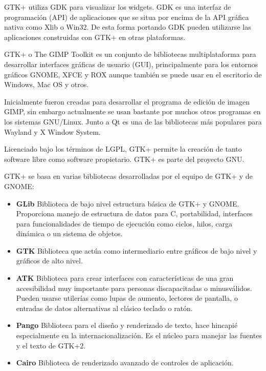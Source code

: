 \documentclass[12pt,twoside]{book}
\begin{document}
GTK+ utiliza GDK para visualizar los widgets. GDK es una interfaz de programación (API) de aplicaciones que se situa por encima de la API gráfica nativa como Xlib o Win32. De esta forma portando GDK pueden utilizarse las aplicaciones construidas con GTK+ en otras plataformas. 

GTK+ o The GIMP Toolkit es un conjunto de bibliotecas multiplataforma para desarrollar interfaces gráficas de usuario (GUI), principalmente para los entornos gráficos GNOME, XFCE y ROX aunque también se puede usar en el escritorio de Windows, Mac OS y otros.

Inicialmente fueron creadas para desarrollar el programa de edición de imagen GIMP, sin embargo actualmente se usan bastante por muchos otros programas en los sistemas GNU/Linux. Junto a Qt es una de las bibliotecas más populares para Wayland y X Window System.

Licenciado bajo los términos de LGPL, GTK+ permite la creación de tanto software libre como software propietario. GTK+ es parte del proyecto GNU.

GTK+ se basa en varias bibliotecas desarrolladas por el equipo de GTK+ y de GNOME:

\begin{itemize}
\item \textbf{GLib} Biblioteca de bajo nivel estructura básica de GTK+ y GNOME. Proporciona manejo de estructura de datos para C, portabilidad, interfaces para funcionalidades de tiempo de ejecución como ciclos, hilos, carga dinámica o un sistema de objetos.

\item \textbf{GTK} Biblioteca que actúa como intermediario entre gráficos de bajo nivel y gráficos de alto nivel.

\item \textbf{ATK} Biblioteca para crear interfaces con características de una gran accesibilidad muy importante para personas discapacitadas o minusválidos. Pueden usarse utilerías como lupas de aumento, lectores de pantalla, o entradas de datos alternativas al clásico teclado o ratón.

\item \textbf{Pango} Biblioteca para el diseño y renderizado de texto, hace hincapié especialmente en la internacionalización. Es el núcleo para manejar las fuentes y el texto de GTK+2.

\item \textbf{Cairo}  Biblioteca de renderizado avanzado de controles de aplicación. 

\end{itemize}
\end{document}
